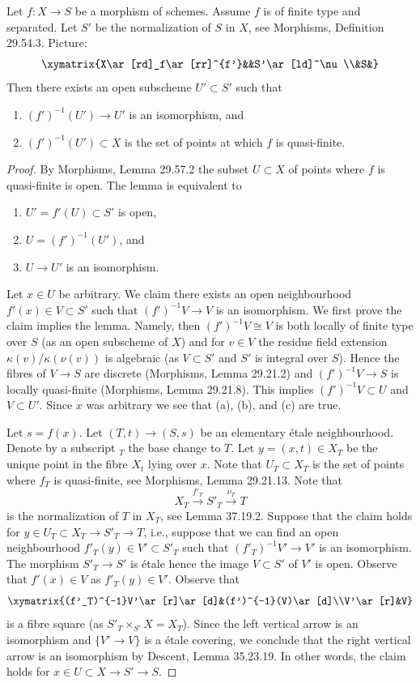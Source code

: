 \begin{lemma}[37.43.1]
Let $f:X\to S$ be a morphism of schemes. Assume $f$ is of finite type and separated. Let $S'$ be the normalization of $S$ in $X$, see Morphisms, Definition 29.54.3. Picture:
\[
\xymatrix{X\ar[rd]_f\ar[rr]^{f'}&&S'\ar[ld]^\nu\\&S&}
\]
Then there exists an open subscheme $U'\subset S'$ such that
\begin{enumerate}
\item $(f')^{-1}(U')\to U'$ is an isomorphism, and
\item $(f')^{-1}(U')\subset X$ is the set of points at which $f$ is quasi-finite.
\end{enumerate}
\end{lemma}
\begin{proof}
By Morphisms, Lemma 29.57.2 the subset $U\subset X$ of points where $f$ is quasi-finite is open. The lemma is equivalent to
\begin{enumerate}[label=(\alph*)]
\item $U'=f'(U)\subset S'$ is open,
\item $U=(f')^{-1}(U')$, and
\item $U\to U'$ is an isomorphism.
\end{enumerate}
Let $x\in U$ be arbitrary. We claim there exists an open neighbourhood $f'(x)\in V\subset S'$ such that $(f')^{-1}V\to V$ is an isomorphism. We first prove the claim implies the lemma. Namely, then $(f')^{-1}V\cong V$ is both locally of finite type over $S$ (as an open subscheme of $X$) and for $v\in V$ the residue field extension $\kappa(v)/\kappa(\nu(v))$ is algebraic (as $V\subset S'$ and $S'$ is integral over $S$). Hence the fibres of $V\to S$ are discrete (Morphisms, Lemma 29.21.2) and $(f')^{-1}V\to S$ is locally quasi-finite (Morphisms, Lemma 29.21.8). This implies $(f')^{-1}V\subset U$ and $V\subset U'$. Since $x$ was arbitrary we see that (a), (b), and (c) are true.

Let $s=f(x)$. Let $(T,t)\to(S,s)$ be an elementary étale neighbourhood. Denote by a subscript ${}_T$ the base change to $T$. Let $y=(x,t)\in X_T$ be the unique point in the fibre $X_t$ lying over $x$. Note that $U_T\subset X_T$ is the set of points where $f_T$ is quasi-finite, see Morphisms, Lemma 29.21.13. Note that
\[
X_T\xrightarrow{f'_T}S'_T\xrightarrow{\nu_T}T
\]
is the normalization of $T$ in $X_T$, see Lemma 37.19.2. Suppose that the claim holds for $y\in U_T\subset X_T\to S'_T\to T$, i.e., suppose that we can find an open neighbourhood $f'_T(y)\in V'\subset S'_T$ such that $(f'_T)^{-1}V'\to V'$ is an isomorphism. The morphism $S'_T\to S'$ is étale hence the image $V\subset S'$ of $V'$ is open. Observe that $f'(x)\in V$ as $f'_T(y)\in V'$. Observe that
\[
\xymatrix{(f'_T)^{-1}V'\ar[r]\ar[d]&(f')^{-1}(V)\ar[d]\\V'\ar[r]&V}
\]
is a fibre square (as $S'_T\times_{S'}X=X_T$). Since the left vertical arrow is an isomorphism and $\{V'\to V\}$ is a étale covering, we conclude that the right vertical arrow is an isomorphism by Descent, Lemma 35.23.19. In other words, the claim holds for $x\in U\subset X\to S'\to S$.


\end{proof}
